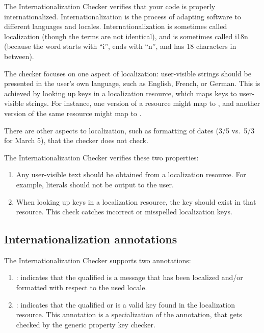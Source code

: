 The Internationalization Checker verifies that your code is properly
internationalized.  Internationalization is the process of adapting
software to different languages and locales.  Internationalization is
sometimes called localization (though the terms are not identical), and is
sometimes called i18n (because the word starts with ``i'', ends with ``n'',
and has 18 characters in between).

The checker focuses on one aspect of localization:  user-visible strings
should be presented in the user's own language, such as English, French, or
German.  This is achieved by looking up keys in a localization resource,
which maps keys to user-visible strings.  For instance, one version of a
resource might map  to
, and another version of the same resource might map
 to .

There are other aspects to localization, such as formatting of dates (3/5
vs.~5/3 for March 5), that the checker does not check.

The Internationalization Checker verifies these two properties:

\begin{enumerate}

\item
  Any user-visible text should be obtained from a localization resource.
  For example,  literals should not be output to the user.

\item
  When looking up keys in a localization resource, the key should exist in
  that resource.  This check catches incorrect or misspelled localization
  keys.

\end{enumerate}


\subsection{Internationalization annotations\label{i18n-annotations}}

The Internationalization Checker supports two annotations:

\begin{enumerate}
\item {}: indicates that the qualified
 is a message that has been localized and/or formatted with
respect to the used locale.

\item {}: indicates that the
qualified  or  is a valid key found in the
localization resource.
This annotation is a specialization of the  annotation, that
gets checked by the generic property key checker.
\end{enumerate}

